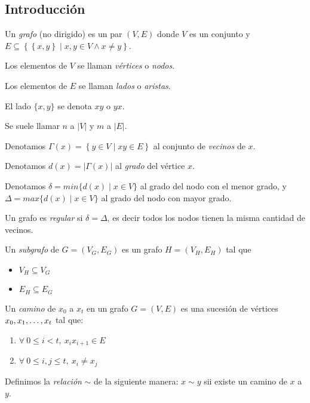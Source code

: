 \subsection{Introducción}

\begin{definition}
Un \emph{grafo} (no dirigido) es un par $(V, E)$ donde $V$ es un conjunto y $E \subseteq \left\{\left\{x,y\right\} \mid x,y \in V \wedge x \neq y \right\}$.
\end{definition}

\begin{notation}
Los elementos de $V$ se llaman \emph{vértices} o \emph{nodos}.

Los elementos de $E$ se llaman \emph{lados} o \emph{aristas}.

El lado $\{x,y\}$ se denota $xy$ o $yx$.

Se suele llamar $n$ a $|V|$ y $m$ a $|E|$.

Denotamos $\Gamma(x) = \left\{y \in V \mid xy \in E \right\}$ al conjunto de \emph{vecinos} de $x$.

Denotamos $d(x) = |\Gamma(x)|$ al \emph{grado} del vértice $x$.

Denotamos $\delta = min\{d(x) \mid x\in V\}$ al grado del nodo con el menor grado, y $\Delta = max\{d(x) \mid x\in V\}$ al grado del nodo con mayor grado.
\end{notation}

\begin{definition}
Un grafo es \emph{regular} si $\delta = \Delta$, es decir todos los nodos tienen la misma cantidad de vecinos.\\
\end{definition}

\begin{definition}
Un \emph{subgrafo} de $G = (V_G,E_G)$ es un grafo $H = (V_H,E_H)$ tal que 
\begin{itemize}
    \item $V_H \subseteq V_G$
    \item $E_H \subseteq E_G$
\end{itemize}
\end{definition}

\begin{definition}
Un \emph{camino} de $x_0$ a $x_t$ en un grafo $G = (V,E)$ es una sucesión de vértices $x_0, x_1, \mathellipsis, x_t$ tal que:
\begin{enumerate}
    \item $\forall~0 \le i < t,~x_i x_{i+1} \in E$
    \item $\forall~0 \le i, j \le t,~x_i \neq x_j$
\end{enumerate}

Definimos la \emph{relación} $\sim$ de la siguiente manera: $x \sim y$ sii existe un camino de $x$ a $y$.
\end{definition}

